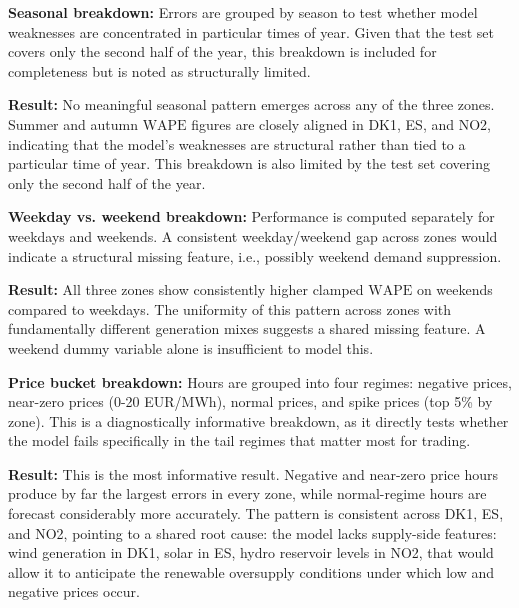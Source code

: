 \documentclass[12pt, a4paper]{article}
\newcommand{\WAPE}{\text{WAPE}}
\begin{document}

\textbf{Seasonal breakdown: }Errors are grouped by season to test whether model weaknesses
are concentrated in particular times of year. Given that the test set covers only
the second half of the year, this breakdown is included for completeness but is
noted as structurally limited.

\textbf{Result: }No meaningful seasonal pattern emerges across any of the three
zones. Summer and autumn $\WAPE$ figures are closely aligned in DK1, ES, and
NO2, indicating that the model's weaknesses are structural rather than tied to a
particular time of year. This breakdown is also limited by the test set covering
only the second half of the year.


\textbf{Weekday vs. weekend breakdown: } Performance is computed separately for weekdays
and weekends. A consistent weekday/weekend gap across zones would indicate a
structural missing feature, i.e., possibly weekend demand suppression.

\textbf{Result: }All three zones show consistently higher clamped $\WAPE$ on
weekends compared to weekdays. The uniformity of this pattern across zones with
fundamentally different generation mixes suggests a shared missing feature. A
weekend dummy variable alone is insufficient to model this.


\textbf{Price bucket breakdown: } Hours are grouped into four regimes: negative prices,
near-zero prices (0-20 EUR/MWh), normal prices, and spike prices (top 5\% by
zone). This is a diagnostically informative breakdown, as it directly tests
whether the model fails specifically in the tail regimes that matter most for
trading.

\textbf{Result: }This is the most informative result. Negative and near-zero
price hours produce by far the largest errors in every zone, while normal-regime
hours are forecast considerably more accurately. The pattern is consistent across
DK1, ES, and NO2, pointing to a shared root cause: the model lacks supply-side
features: wind generation in DK1, solar in ES, hydro reservoir levels in NO2,
that would allow it to anticipate the renewable oversupply conditions under which
low and negative prices occur.
\end{document}
